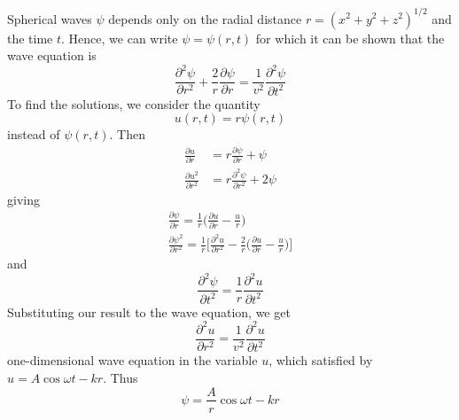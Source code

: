 \documentclass[../../../main.tex]{subfiles}
\begin{document}
Spherical waves $\psi$ depends only on the radial distance $r = (x^2 + y^2 + z^2)^{1/2}$ and the time $t$. Hence, we can write $\psi = \psi(r, t)$ for which it can be shown that the wave equation is
\begin{equation*}
    \frac{\partial^2 \psi}{\partial r^2}+\frac{2}{r}\frac{\partial \psi}{\partial r}=\frac{1}{v^2} \frac{\partial^2 \psi}{\partial t^2}
\end{equation*}
To ﬁnd the solutions, we consider the quantity
\begin{equation*}
    u(r,t)=r\psi(r,t)
\end{equation*}
instead of $\psi(r,t)$. Then
\begin{align*}
    \frac{\partial u}{\partial r}&=r \frac{\partial \psi}{\partial r}+\psi\\
    \frac{\partial u^2}{\partial r^2}&=r \frac{\partial^2 \psi}{\partial r^2}+2\psi
\end{align*}
giving
\begin{align*}
    \frac{\partial \psi}{\partial r}=\frac{1}{r}\biggl(\frac{\partial u}{\partial r}-\frac{u}{r}\biggr)\\
    \frac{\partial \psi^2}{\partial r^2}=\frac{1}{r}\biggl[\frac{\partial^2 u}{\partial r^2}-\frac{2}{r}\biggl(\frac{\partial u}{\partial r}-\frac{u}{r}\biggr)\biggr]
\end{align*}
and
\begin{equation*}
    \frac{\partial^2 \psi}{\partial t^2}=\frac{1}{r}\frac{\partial^2 u}{\partial t^2}
\end{equation*}
Substituting our result to the wave equation, we get
\begin{equation*}
    \frac{\partial^2 u}{\partial r^2}=\frac{1}{v^2}\frac{\partial^2 u}{\partial t^2}
\end{equation*}
one-dimensional wave equation in the variable $u$, which satisfied by $u=A\cos \omega t - kr$. Thus
\begin{equation*}
    \psi=\frac{A}{r}\cos \omega t - kr
\end{equation*}
\end{document}
